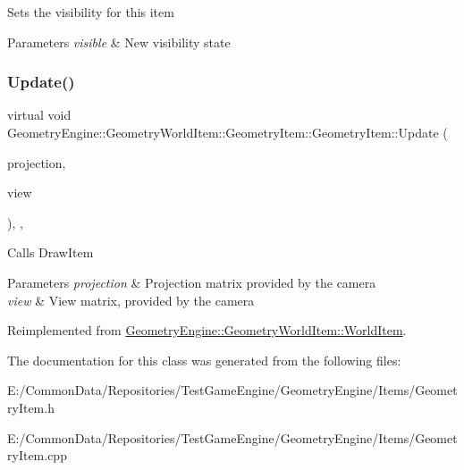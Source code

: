 Sets the visibility for this item 
\begin{DoxyParams}{Parameters}
{\em visible} & New visibility state \\
\hline
\end{DoxyParams}
\mbox{\label{class_geometry_engine_1_1_geometry_world_item_1_1_geometry_item_1_1_geometry_item_aa07c13861cf4aef269442071e4150389}} 
\subsubsection{\texorpdfstring{Update()}{Update()}}
{\footnotesize\ttfamily virtual void Geometry\+Engine\+::\+Geometry\+World\+Item\+::\+Geometry\+Item\+::\+Geometry\+Item\+::\+Update (\begin{DoxyParamCaption}\item[{const Q\+Matrix4x4 \&}]{projection,  }\item[{const Q\+Matrix4x4 \&}]{view }\end{DoxyParamCaption})\hspace{0.3cm}{\ttfamily [inline]}, {\ttfamily [override]}, {\ttfamily [virtual]}}

Calls Draw\+Item


\begin{DoxyParams}{Parameters}
{\em projection} & Projection matrix provided by the camera \\
\hline
{\em view} & View matrix, provided by the camera \\
\hline
\end{DoxyParams}


Reimplemented from \mbox{\hyperlink{class_geometry_engine_1_1_geometry_world_item_1_1_world_item_aa6e82e5d95ae34d0addb991cd84aca6f}{Geometry\+Engine\+::\+Geometry\+World\+Item\+::\+World\+Item}}.



The documentation for this class was generated from the following files\+:\begin{DoxyCompactItemize}
\item 
E\+:/\+Common\+Data/\+Repositories/\+Test\+Game\+Engine/\+Geometry\+Engine/\+Items/Geometry\+Item.\+h\item 
E\+:/\+Common\+Data/\+Repositories/\+Test\+Game\+Engine/\+Geometry\+Engine/\+Items/Geometry\+Item.\+cpp\end{DoxyCompactItemize}
